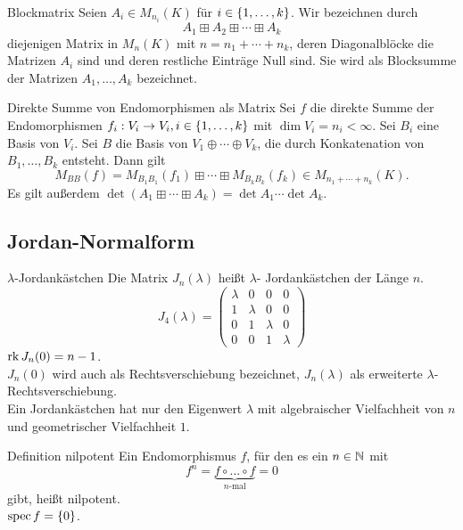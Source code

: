 \documentclass[main.tex]{subfiles}
\begin{document}
\begin{karte}{Blockmatrix}
    Seien \( A_i \in M_{n_i}(K) \) für \( i\in \{1,\ldots,k\} \). 
    Wir bezeichnen durch 
    \[ A_1 \boxplus A_2 \boxplus \cdots \boxplus A_k \] 
    diejenigen Matrix in \( M_n(K) \) mit \( n=n_1 + \cdots + n_k \), 
    deren Diagonalblöcke die Matrizen \( A_i \) sind und deren restliche 
    Einträge Null sind. Sie wird als Blocksumme der Matrizen 
    \( A_1, \ldots, A_k \) bezeichnet.
\end{karte}

\begin{karte}{Direkte Summe von Endomorphismen als Matrix}
    Sei \( f \) die direkte Summe der Endomorphismen 
    \( f_i : V_i \rightarrow V_i, i\in \{1,\ldots, k\} \) 
    mit \( \dim V_i = n_i < \infty \). Sei \( B_i \) 
    eine Basis von \( V_i \). Sei \(B\) die Basis von 
    \( V_1 \oplus \cdots \oplus V_k \), die durch 
    Konkatenation von \( B_1, \ldots, B_k \) entsteht. 
    Dann gilt 
    \[ M_{BB}(f) = M_{B_1B_1}(f_1) \boxplus \cdots \boxplus M_{B_k B_k}(f_k)
    \in M_{ n_1 + \cdots + n_k }(K). \]
    Es gilt außerdem \( \det (A_1 \boxplus \cdots \boxplus A_k) = \det A_1 \cdots \det A_k \).
\end{karte}

\subsection*{Jordan-Normalform}

\begin{karte}{\(\lambda\)-Jordankästchen}
    Die Matrix \(J_n(\lambda)\) heißt \(\lambda\)- Jordankästchen der
    Länge \(n\).
    \[J_4(\lambda) = \begin{pmatrix}
        \lambda &0 &0 &0\\
        1 &\lambda & 0 &0\\
        0 &1 &\lambda &0\\
        0 &0 &1 &\lambda
    \end{pmatrix}\]
    \(\operatorname{rk} J_n(0) = n-1\).\\
    \(J_n(0)\) wird auch als Rechtsverschiebung bezeichnet, \(J_n(\lambda)\)
    als erweiterte \(\lambda\)-Rechtsverschiebung.\\
    Ein Jordankästchen hat nur den Eigenwert \(\lambda\) mit algebraischer Vielfachheit
    von \(n\) und geometrischer Vielfachheit \(1\).
\end{karte}

\begin{karte}{Definition nilpotent}
    Ein Endomorphismus \(f\), für den es ein \(n \in \mathbb{N}\) mit
    \[ f^n = \underbrace{f \circ \ldots \circ f}_{n\text{-mal}} = 0 \]
    gibt, heißt nilpotent.\\
    \(\operatorname{spec} f = \{0\}\).
\end{karte}
\end{document}

